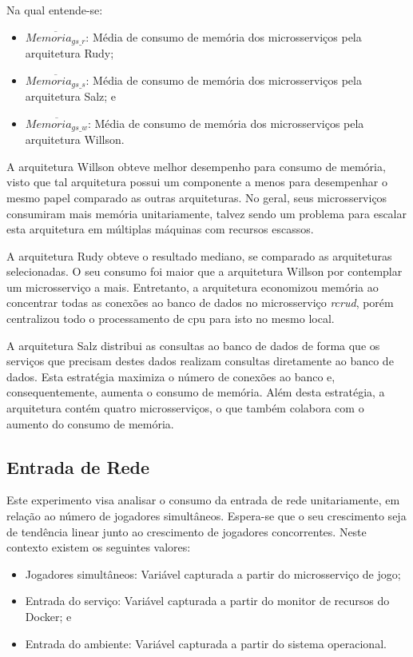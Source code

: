 Na qual entende-se:

\begin{itemize}
\item $\overline{Memoria_{gs\_r}}$: Média de consumo de memória dos microsserviços pela arquitetura Rudy;
\item $\overline{Memoria_{gs\_s}}$: Média de consumo de memória dos microsserviços pela arquitetura Salz; e
\item $\overline{Memoria_{gs\_w}}$: Média de consumo de memória dos microsserviços pela arquitetura Willson.
\end{itemize}

A arquitetura Willson obteve melhor desempenho para consumo de memória, visto que tal arquitetura possui um componente a menos para desempenhar o mesmo papel comparado as outras arquiteturas.
%
No geral, seus microsserviços consumiram mais memória unitariamente, talvez sendo um problema para escalar esta arquitetura em múltiplas máquinas com recursos escassos.

A arquitetura Rudy obteve o resultado mediano, se comparado as arquiteturas selecionadas.
%
O seu consumo foi maior que a arquitetura Willson por contemplar um microsserviço a mais.
%
Entretanto, a arquitetura economizou memória ao concentrar todas as conexões ao banco de dados no microsserviço \textit{rcrud}, porém centralizou todo o processamento de \ac{cpu} para isto no mesmo local.

A arquitetura Salz distribui as consultas ao banco de dados de forma que os serviços que precisam destes dados realizam consultas diretamente ao banco de dados.
%
Esta estratégia maximiza o número de conexões ao banco e, consequentemente, aumenta o consumo de memória.
%
Além desta estratégia, a arquitetura contém quatro microsserviços, o que também colabora com o aumento do consumo de memória.


\subsection{Entrada de Rede}

Este experimento visa analisar o consumo da entrada de rede unitariamente, em relação ao número de jogadores simultâneos.
%
Espera-se que o seu crescimento seja de tendência linear junto ao crescimento de jogadores concorrentes.
%
Neste contexto existem os seguintes valores:

\begin{itemize}
    \item Jogadores simultâneos: Variável capturada a partir do microsserviço de jogo;
    \item Entrada do serviço: Variável capturada a partir do monitor de recursos do Docker; e
    \item Entrada do ambiente: Variável capturada a partir do sistema operacional.
\end{itemize}

